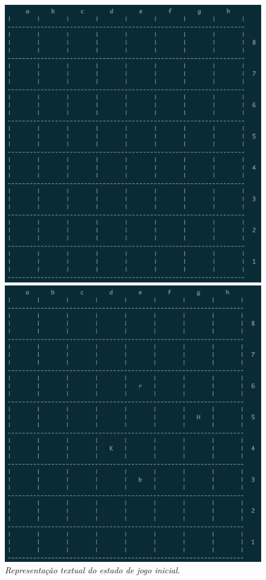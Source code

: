 \documentclass[a4paper]{article}
\begin{document}
\begin{small}
\begin{figure}[!htb]
\includegraphics[scale=0.3]{board-texto-1.png}
\caption{\textit{ Representação textual do estado de jogo inicial.}}
\label{fig:fig5}
\endminipage\hfill
{}
\includegraphics[scale=0.3]{board-texto-2.png}

\end{figure}
\end{small}
\end{document}
